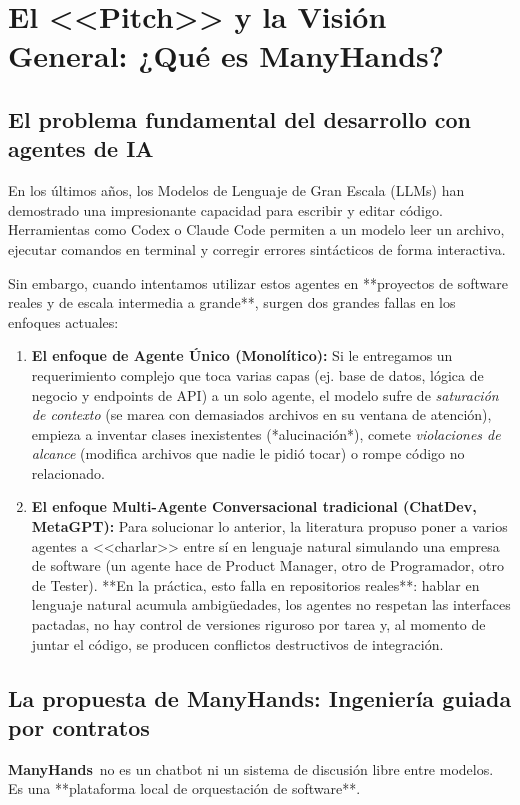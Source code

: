 \documentclass[11pt,a4paper]{article}
\newcommand{\sistema}{\textbf{ManyHands}}
\begin{document}
\section{El <<Pitch>> y la Visión General: ¿Qué es ManyHands?}

\subsection{El problema fundamental del desarrollo con agentes de IA}
En los últimos años, los Modelos de Lenguaje de Gran Escala (LLMs) han demostrado una impresionante capacidad para escribir y editar código. Herramientas como Codex o Claude Code permiten a un modelo leer un archivo, ejecutar comandos en terminal y corregir errores sintácticos de forma interactiva.

Sin embargo, cuando intentamos utilizar estos agentes en **proyectos de software reales y de escala intermedia a grande**, surgen dos grandes fallas en los enfoques actuales:

\begin{enumerate}[leftmargin=1.8cm]
  \item \textbf{El enfoque de Agente Único (Monolítico):} Si le entregamos un requerimiento complejo que toca varias capas (ej. base de datos, lógica de negocio y endpoints de API) a un solo agente, el modelo sufre de \emph{saturación de contexto} (se marea con demasiados archivos en su ventana de atención), empieza a inventar clases inexistentes (*alucinación*), comete \emph{violaciones de alcance} (modifica archivos que nadie le pidió tocar) o rompe código no relacionado.
  \item \textbf{El enfoque Multi-Agente Conversacional tradicional (ChatDev, MetaGPT):} Para solucionar lo anterior, la literatura propuso poner a varios agentes a <<charlar>> entre sí en lenguaje natural simulando una empresa de software (un agente hace de Product Manager, otro de Programador, otro de Tester). **En la práctica, esto falla en repositorios reales**: hablar en lenguaje natural acumula ambigüedades, los agentes no respetan las interfaces pactadas, no hay control de versiones riguroso por tarea y, al momento de juntar el código, se producen conflictos destructivos de integración.
\end{enumerate}

\subsection{La propuesta de ManyHands: Ingeniería guiada por contratos}
\sistema\ no es un chatbot ni un sistema de discusión libre entre modelos. Es una **plataforma local de orquestación de software**. 
\end{document}
